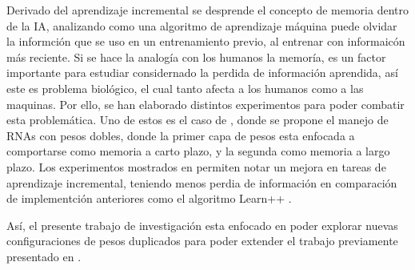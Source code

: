 Derivado del aprendizaje incremental se desprende el concepto de memoria dentro de la IA, analizando como una algoritmo de aprendizaje máquina puede olvidar la informción que se uso en un entrenamiento previo, al entrenar con informaicón más reciente. Si se hace la analogía con los humanos la memoría, es un factor importante para estudiar considernado la perdida de información aprendida, así este es problema biol\'ogico, el cual tanto afecta a los humanos como a las maquinas. Por ello, se han elaborado distintos experimentos para poder combatir esta problemática.  Uno de estos es el caso de \cite{Bullinaria2009},  donde se propone el manejo de RNAs con pesos dobles,  donde la primer capa de pesos esta enfocada a comportarse como memoria a carto plazo, y la segunda como memoria a largo plazo.  Los experimentos mostrados en \cite{Bullinaria2009} permiten notar un mejora en tareas de aprendizaje incremental, teniendo menos perdia de información en comparación de implementción anteriores como el algoritmo  Learn++ \cite{li2008,Elwell2011}.

Así, el presente trabajo de investigación esta enfocado en poder explorar nuevas configuraciones de pesos duplicados para poder extender el trabajo previamente presentado en \cite{Bullinaria2009}.







